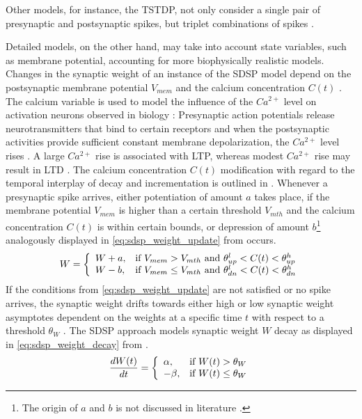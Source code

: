 Other models, for instance, the \ac{TSTDP}, not only consider a single pair of presynaptic and postsynaptic spikes, 
but triplet combinations of spikes \cite{Synaptic_plasticity,STDP_triplet}.

Detailed models, on the other hand, may take into account state variables, such as membrane potential, 
accounting for more biophysically realistic models.
Changes in the synaptic weight of an instance of the \ac{SDSP} model depend on the postsynaptic membrane potential $V_{mem}$ and 
the calcium concentration $C(t)$ \cite{Synaptic_plasticity}.
The calcium variable is used to model the influence of the $Ca^{2+}$ level on activation neurons observed in biology \cite{STDP_hebbian}:
Presynaptic action potentials release neurotransmitters that bind to certain receptors and 
when the postsynaptic activities provide sufficient constant membrane depolarization, the $Ca^{2+}$ level rises \cite{Synaptic_plasticity}.
A large $Ca^{2+}$ rise is associated with \ac{LTP}, whereas modest $Ca^{2+}$ rise may result in \ac{LTD} \cite{STDP_hebbian}.
The calcium concentration $C(t)$  modification with regard to the temporal interplay of decay and incrementation is outlined in \cite{simulation_STDP}.
Whenever a presynaptic spike arrives, either potentiation of amount $a$ takes place, 
if the membrane potential $V_{mem}$ is higher than a certain threshold $V_{mth}$ and the 
calcium concentration $C(t)$ is within certain bounds, 
or depression of amount $b$\footnote{The origin of $a$ and $b$ is not discussed in literature \cite{Synaptic_plasticity}.} analogously displayed in \autoref{eq:sdsp_weight_update} from \cite{Synaptic_plasticity} occurs.
%
\begin{equation}
    \centering
    \label{eq:sdsp_weight_update} 
    W = 
    \left\{
    \begin{array}{ll}
        W + a, & \text{if } V_{mem} > V_{mth} \text{ and } \theta^l_{up} < C(t) < \theta^h_{up}\\
        W - b, & \text{if } V_{mem} \le V_{mth} \text{ and } \theta^l_{dn} < C(t) < \theta^h_{dn}
    \end{array}
    \right.
\end{equation}
%
If the conditions from \autoref{eq:sdsp_weight_update} are not satisfied or no spike arrives, 
the synaptic weight drifts towards either high or low synaptic weight asymptotes dependent on the weights at a specific time $t$ 
with respect to a threshold $\theta_W$ \cite{Synaptic_plasticity}.
The \ac{SDSP} approach models synaptic weight $W$ decay as displayed in \autoref{eq:sdsp_weight_decay} from \cite{Synaptic_plasticity}.
%
\begin{equation}
    \centering
    \label{eq:sdsp_weight_decay}
    \frac{dW(t)}{dt} = 
    \left\{
    \begin{array}{ll}
        \alpha, & \text{if } W(t) > \theta_W\\
        - \beta, & \text{if } W(t) \le \theta_W\\
    \end{array}
    \right.
\end{equation}

